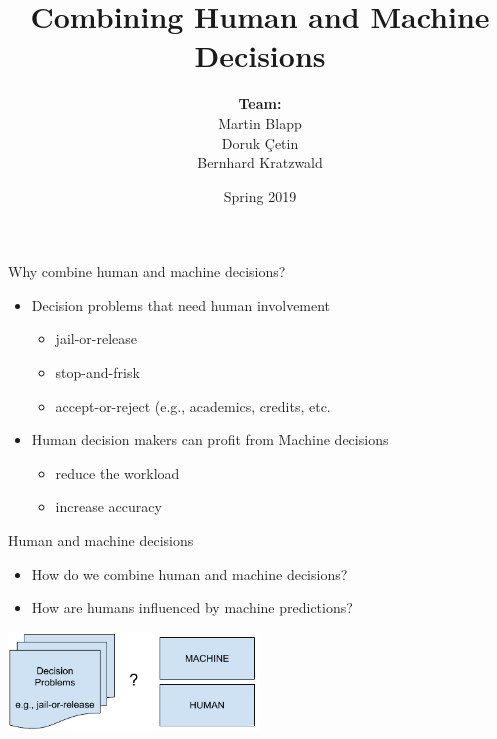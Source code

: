 \documentclass[11pt]{beamer}
\begin{document}
\author[]{\begin{tabular}{c} 
\\ \textbf{Team:} \\
{\small Martin Blapp}\\
{\small Doruk Çetin}\\
{\small Bernhard Kratzwald}\\
\end{tabular}}

\date{Spring 2019}

\title{Combining Human and Machine Decisions}



\begin{frame}{Why combine human and machine decisions?}
\begin{itemize}
	\setlength\itemsep{1em}
	\item Decision problems that need human involvement
	\begin{itemize}
	\item jail-or-release
	\item stop-and-frisk
	\item accept-or-reject (e.g., academics, credits, etc.	
	\end{itemize}
	\item Human decision makers can profit from Machine decisions
		\begin{itemize}
		\item reduce the workload
		\item increase accuracy
	\end{itemize}
\end{itemize}
\end{frame}

\begin{frame}{Human and machine decisions}
\begin{itemize}
	\item How do we combine human and machine decisions?
	\item How are humans influenced by machine predictions? 
\end{itemize}
\centering
\includegraphics[width=0.5\textwidth]{Figures/problem_statement.pdf}

\end{frame}
\end{document}
